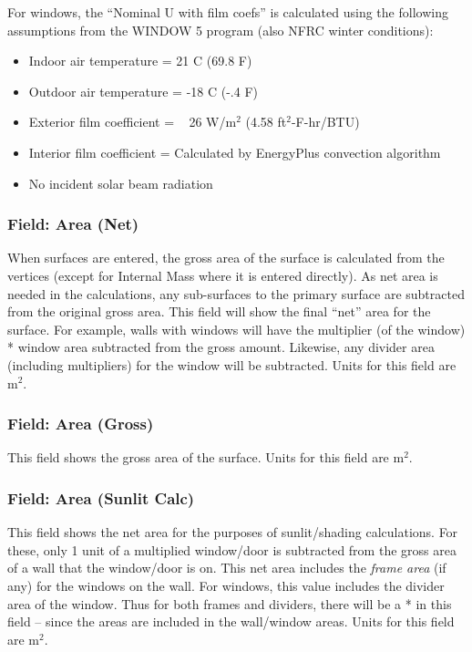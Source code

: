 For windows, the ``Nominal U with film coefs'' is calculated using the following assumptions from the WINDOW 5 program (also NFRC winter conditions):

\begin{itemize}
\item
  Indoor air temperature = 21 C (69.8 F)
\item
  Outdoor air temperature = -18 C (-.4 F)
\item
  Exterior film coefficient = ~ 26 W/m\(^{2}\) (4.58 ft\(^{2}\)-F-hr/BTU)
\item
  Interior film coefficient = Calculated by EnergyPlus convection algorithm
\item
  No incident solar beam radiation
\end{itemize}

\subsubsection{Field: Area (Net)}\label{field-area-net}

When surfaces are entered, the gross area of the surface is calculated from the vertices (except for Internal Mass where it is entered directly). As net area is needed in the calculations, any sub-surfaces to the primary surface are subtracted from the original gross area. This field will show the final ``net'' area for the surface. For example, walls with windows will have the multiplier (of the window) * window area subtracted from the gross amount. Likewise, any divider area (including multipliers) for the window will be subtracted. Units for this field are m\(^{2}\).

\subsubsection{Field: Area (Gross)}\label{field-area-gross}

This field shows the gross area of the surface. Units for this field are m\(^{2}\).

\subsubsection{Field: Area (Sunlit Calc)}\label{field-area-sunlit-calc}

This field shows the net area for the purposes of sunlit/shading calculations. For these, only 1 unit of a multiplied window/door is subtracted from the gross area of a wall that the window/door is on. This net area includes the \emph{frame area} (if any) for the windows on the wall. For windows, this value includes the divider area of the window. Thus for both frames and dividers, there will be a * in this field -- since the areas are included in the wall/window areas. Units for this field are m\(^{2}\).

